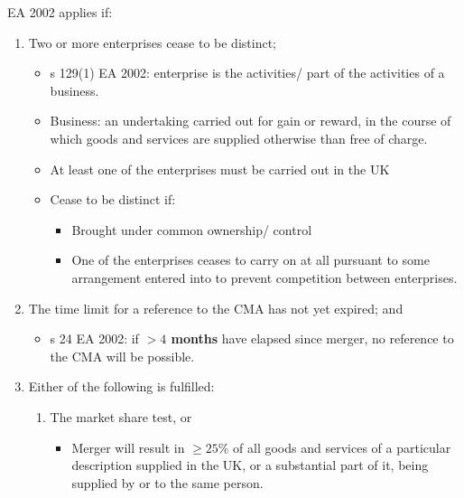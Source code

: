 \documentclass[
]{article}
\providecommand{\tightlist}{%
  \setlength{\itemsep}{0pt}\setlength{\parskip}{0pt}}
\begin{document}
EA 2002 applies if:

\begin{enumerate}
\def\labelenumi{\arabic{enumi}.}
\tightlist
\item
  Two or more enterprises cease to be distinct;

  \begin{itemize}
  \tightlist
  \item
    s 129(1) EA 2002: enterprise is the activities/ part of the
    activities of a business.
  \item
    Business: an undertaking carried out for gain or reward, in the
    course of which goods and services are supplied otherwise than free
    of charge.
  \item
    At least one of the enterprises must be carried out in the UK
  \item
    Cease to be distinct if:

    \begin{itemize}
    \tightlist
    \item
      Brought under common ownership/ control
    \item
      One of the enterprises ceases to carry on at all pursuant to some
      arrangement entered into to prevent competition between
      enterprises.
    \end{itemize}
  \end{itemize}
\item
  The time limit for a reference to the CMA has not yet expired; and

  \begin{itemize}
  \tightlist
  \item
    s 24 EA 2002: if \textbf{\(>4\) months} have elapsed since merger,
    no reference to the CMA will be possible.
  \end{itemize}
\item
  Either of the following is fulfilled:

  \begin{enumerate}
  \def\labelenumii{\arabic{enumii}.}
  \tightlist
  \item
    The market share test, or

    \begin{itemize}
    \tightlist
    \item
      Merger will result in \(\geq 25\%\) of all goods and services of a
      particular description supplied in the UK, or a substantial part
      of it, being supplied by or to the same person.


\end{itemize}
\end{enumerate}
\end{enumerate}
\end{document}
